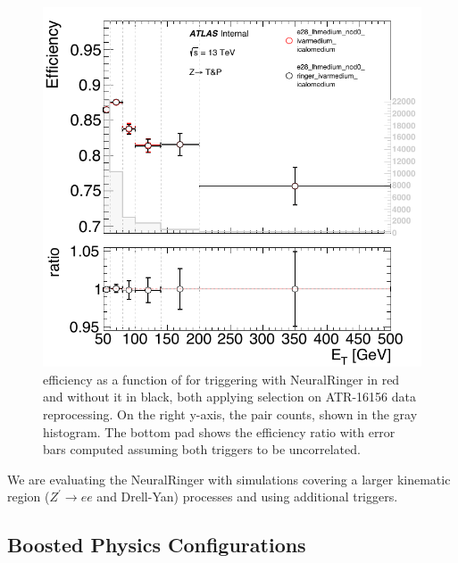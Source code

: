 \begin{figure}[htb]
  \centering
  \includegraphics[width=.5\textwidth]{sections/other_studies/figures/high_et_e28_lhmedium_nod0}
  \caption{\Zee{} \tnp{} efficiency as a function of \et{} for triggering with
  NeuralRinger in red and without it in black, both applying \medium{} selection
on ATR-16156 data reprocessing. On the right y-axis, the \tnp{} pair counts,
shown in the gray histogram. The bottom pad shows the efficiency ratio with
error bars computed assuming both triggers to be
uncorrelated.\label{fig:high_et_eff}}
\end{figure}





We are evaluating the NeuralRinger with simulations covering a larger kinematic region
($Z^{'}\rightarrow ee$ and Drell-Yan) processes and using additional triggers.

\subsection{Boosted Physics Configurations}\label{ssec:boosted_topology}



